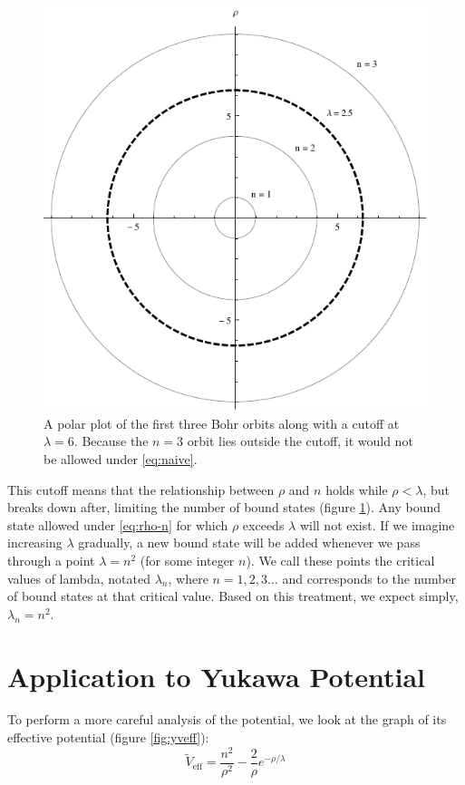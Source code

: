 \documentclass[12pt,twoside]{reedthesis}
\newcommand{\eqn}[1]{\begin{equation}#1\end{equation}}
\newcommand{\fig}[2]{\begin{figure}\begin{center}#1\end{center}#2\end{figure}}
\begin{document}
\fig{
\includegraphics{Figures/cutoff}}
{
\caption[Yukawa orbits with cutoff]{A polar plot of the first three Bohr orbits along with a cutoff at $\lambda = 6$. Because the $n=3$ orbit lies outside the cutoff, it would not be allowed under \eqref{eq:naive}.}
\label{fig:cutoff}
}

This cutoff means that the relationship between $\rho$ and $n$ holds while $\rho < \lambda$, but breaks down after, limiting the number of bound states (figure \ref{fig:cutoff}). Any bound state allowed under \eqref{eq:rho-n} for which $\rho$ exceeds $\lambda$ will not exist. If we imagine increasing $\lambda$ gradually, a new bound state will be added whenever we pass through a point $\lambda = n^2$ (for some integer $n$). We call these points the critical values of lambda, notated $\lambda_{n}$, where $n = 1, 2, 3\ldots$ and corresponds to the number of bound states at that critical value. Based on this treatment, we expect simply, $\lambda_{n} = n^2$.

\section{Application to Yukawa Potential}
To perform a more careful analysis of the potential, we look at the graph of its effective potential (figure \ref{fig:yveff}):
\eqn{
\tilde{V}_{\mathrm{eff}} = \frac{n^2}{\rho^2} - \frac{2}{\rho}e^{-\rho/\lambda}
\label{eq:yveff}
}
 
\end{document}
